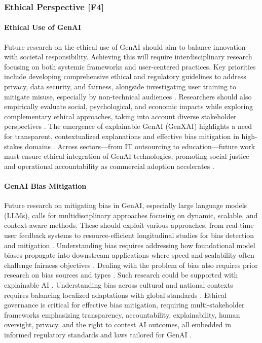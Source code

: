 \subsubsection{Ethical Perspective [F4]}

\paragraph{Ethical Use of GenAI}
Future research on the ethical use of GenAI should aim to balance innovation with societal responsibility. Achieving this will require interdisciplinary research focusing on both systemic frameworks and user-centered practices. Key priorities include developing comprehensive ethical and regulatory guidelines to address privacy, data security, and fairness, alongside investigating user training to mitigate misuse, especially by non-technical audiences \parencite{R01,S06,S11,S12,R07}. Researchers should also empirically evaluate social, psychological, and economic impacts while exploring complementary ethical approaches, taking into account diverse stakeholder perspectives \parencite{R02,R09,S09}. The emergence of explainable GenAI (GenXAI) highlights a need for transparent, contextualized explanations and effective bias mitigation in high-stakes domains \parencite{S18}. Across sectors—from IT outsourcing to education—future work must ensure ethical integration of GenAI technologies, promoting social justice and operational accountability as commercial adoption accelerates \parencite{R03,R10,R08}.

\paragraph{GenAI Bias Mitigation}
Future research on mitigating bias in GenAI, especially large language models (LLMs), calls for multidisciplinary approaches focusing on dynamic, scalable, and context-aware methods. These should exploit various approaches, from real-time user feedback systems to resource-efficient longitudinal studies for bias detection and mitigation \parencite{R01}. 
Understanding bias requires addressing how foundational model biases propagate into downstream applications where speed and scalability often challenge fairness objectives \parencite{R01,R09}.
Dealing with the problem of bias also requires prior research on bias sources and types \parencite{R01,R02,R07,R08}. Such research could be supported with explainable AI \parencite{S18}. Understanding bias across cultural and national contexts requires balancing localized adaptations with global standards \parencite{R01}.
Ethical governance is critical for effective bias mitigation, requiring multi-stakeholder frameworks emphasizing transparency, accountability, explainability, human oversight, privacy, and the right to contest AI outcomes, all embedded in informed regulatory standards and laws tailored for GenAI \parencite{R07, S11, S17}.


